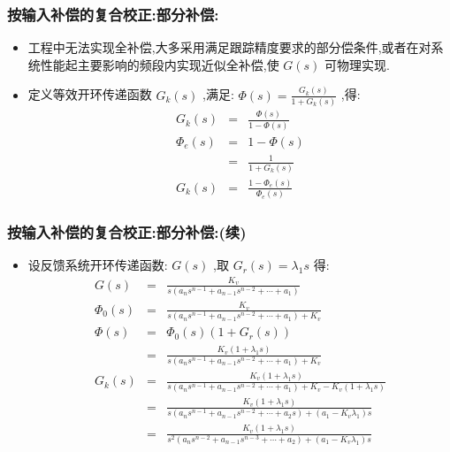 \documentclass[table]{article}
\begin{document}
\begin{frame}
\frametitle{按输入补偿的复合校正:部分补偿:}
\label{sec-4-3-3}

\begin{itemize}
\item <2->工程中无法实现全补偿,大多采用满足跟踪精度要求的部分偿条件,或者在对系统性能起主要影响的频段内实现近似全补偿,使  $G(s)$ 可物理实现.
\item <3->定义等效开环传递函数  $G_k(s)$ ,满足:  $\Phi(s)=\frac{G_k(s)}{1+G_k(s)}$  ,得:
       \begin{eqnarray*}
       G_k(s) &=& \frac{\Phi(s)}{1-\Phi(s)}\\
       \Phi_e(s) & = & 1-\Phi(s) \\
               	&=& \frac{1}{1+G_k(s)}\\
       G_k(s) &=& \frac{1-\Phi_e(s)}{\Phi_e(s)}
       \end{eqnarray*}
\end{itemize}
\end{frame}
\begin{frame}
\frametitle{按输入补偿的复合校正:部分补偿:(续)}
\label{sec-4-3-4}

\begin{itemize}
\item 设反馈系统开环传递函数:  $G(s)$  ,取  $G_r(s)=\lambda_1 s$  得:
       \begin{eqnarray*}
       G(s) & = & \frac{K_v}{s(a_ns^{n-1}+a_{n-1}s^{n-2}+\cdots+a_1)} \\
       \Phi_0(s) &=& \frac{K_v}{s(a_ns^{n-1}+a_{n-1}s^{n-2}+\cdots+a_1)+K_v} \\
       \Phi(s) &=& \Phi_0(s)(1+G_r(s)) \\
               &=& \frac{K_v(1+\lambda_1 s)}{s(a_ns^{n-1}+a_{n-1}s^{n-2}+\cdots+a_1)+K_v}\\
       G_k(s) &=& \frac{K_v(1+\lambda_1 s)}{s(a_ns^{n-1}+a_{n-1}s^{n-2}+\cdots+a_1)+K_v -K_v(1+\lambda_1 s)}\\
           &=& \frac{K_v(1+\lambda_1 s)}{s(a_ns^{n-1}+a_{n-1}s^{n-2}+\cdots+a_2 s)+(a_1 -K_v\lambda_1) s}\\
           &=& \frac{K_v(1+\lambda_1 s)}{s^2(a_ns^{n-2}+a_{n-1}s^{n-3}+\cdots+a_2 )+(a_1 -K_v\lambda_1) s}
       \end{eqnarray*}
\end{itemize}
\end{frame}
\end{document}
